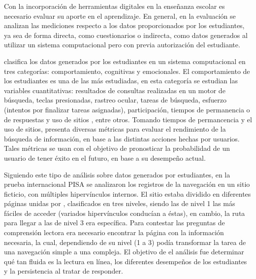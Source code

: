 
Con la incorporación de herramientas digitales en la enseñanza escolar es necesario evaluar su aporte en el aprendizaje. En general, en la evaluación se analizan las mediciones respecto a los datos proporcionados por los estudiantes, ya sea de forma directa, como cuestionarios o indirecta, como datos generados al utilizar un sistema computacional pero con previa autorización del estudiante.

\textcite{henrie2015measuring} clasifica los datos generados por los estudiantes en un sistema computacional en tres categorías: comportamiento, cognitivas y emocionales. El comportamiento de los estudiantes es una de las más estudiadas, en esta categoría se estudian las variables cuantitativas: resultados de consultas realizadas en un motor de búsqueda, teclas presionadas, rastreo ocular, tareas de búsqueda, esfuerzo (intentos por finalizar tareas asignadas), participación, tiempos de permanencia o de respuestas y uso de sitios , entre otros. Tomando tiempos de permancencia y el uso de sitios, \textcite{Shah2016} presenta diversas métricas para evaluar el rendimiento de la búsqueda de información, en base a las distintas acciones hechas por usuarios. Tales métricas se usan con el objetivo de pronosticar la probabilidad de un usuario de tener éxito en el futuro, en base a su desempeño actual. 

Siguiendo este tipo de análisis sobre datos generados por estudiantes, en la prueba internacional PISA \parencite{PISA} se analizaron los registros de la navegación en un sitio  ficticio, con múltiples hipervínculos internos. El sitio estaba dividido en diferentes páginas unidas por , clasificados en tres niveles, siendo las de nivel 1 las más fáciles de acceder (variados hipervínculos conducían a éstas), en cambio, la ruta para llegar a las de nivel 3 era específica. Para contestar las preguntas de comprensión lectora era necesario encontrar la página con la información necesaria, la cual, dependiendo de su nivel (1 a 3) podía transformar la tarea de una navegación simple a una compleja. El objetivo de el análisis fue determinar qué tan fluida es la lectura en línea, los diferentes desempeños de los estudiantes y la persistencia al tratar de responder.

